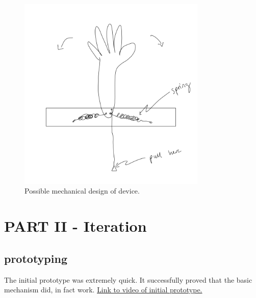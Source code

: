 \documentclass[11pt]{report}
\begin{document}
\begin{figure}[ht]
\centering
\includegraphics[width=0.8\textwidth]{"images/I/wavemachine_sketch.png"}
\caption{Possible mechanical design of device.}
\label{fig:sketch}
\end{figure}

\clearpage
\section*{PART II - Iteration}
\subsection*{prototyping}

The initial prototype was extremely quick. It successfully proved that the basic mechanism did, in fact work. \href{https://drive.google.com/file/d/1A-JF5d3mOUxOp_nL0GExQ2gzeuzpgY3x/view?usp=sharing}{Link to video of initial prototype.}
\end{document}
